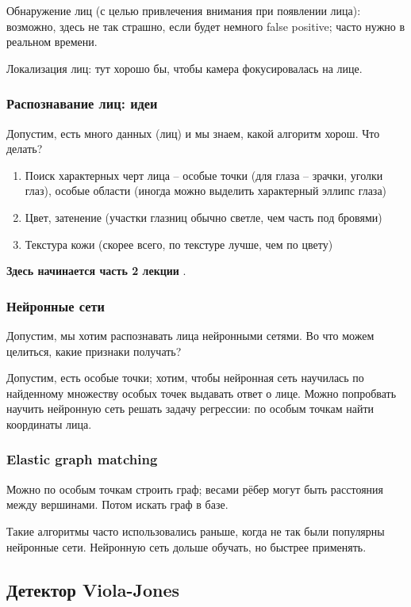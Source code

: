\documentclass[main.tex]{subfiles}
\begin{document}
Обнаружение лиц (с целью привлечения внимания при появлении лица): возможно, здесь не так страшно, если будет немного false positive; часто нужно в реальном времени.

Локализация лиц: тут хорошо бы, чтобы камера фокусировалась на лице.

\subsubsection{Распознавание лиц: идеи}

Допустим, есть много данных (лиц) и мы знаем, какой алгоритм хорош.
Что делать?

\begin{enumerate}[noitemsep]
	\item Поиск характерных черт лица -- особые точки (для глаза -- зрачки, уголки глаз), особые области (иногда можно выделить характерный эллипс глаза)
	\item Цвет, затенение (участки глазниц обычно светле, чем часть под бровями)
	\item Текстура кожи (скорее всего, по текстуре лучше, чем по цвету)
\end{enumerate}

\textbf{ Здесь начинается часть 2 лекции }.

\subsubsection{Нейронные сети}

Допустим, мы хотим распознавать лица нейронными сетями.
Во что можем целиться, какие признаки получать?

Допустим, есть особые точки; хотим, чтобы нейронная сеть научилась по найденному множеству особых точек выдавать ответ о лице.
Можно попробвать научить нейронную сеть решать задачу регрессии: по особым точкам найти координаты лица.

\subsubsection{Elastic graph matching}

Можно по особым точкам строить граф; весами рёбер могут быть расстояния между вершинами.
Потом искать граф в базе.

Такие алгоритмы часто использовались раньше, когда не так были популярны нейронные сети.
Нейронную сеть дольше обучать, но быстрее применять.

\subsection{Детектор Viola-Jones}
\end{document}
